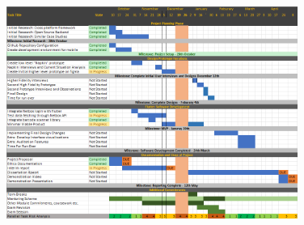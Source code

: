 \documentclass [11pt,a4paper]{article}
\begin{document}
\begin{figure}[H]
    \centering
    \includegraphics[width=0.85\textwidth]{images/keeptrack-gantt-interim.png}
    \label{fig:updatedworkplan}
\end{figure}


\end{document}

